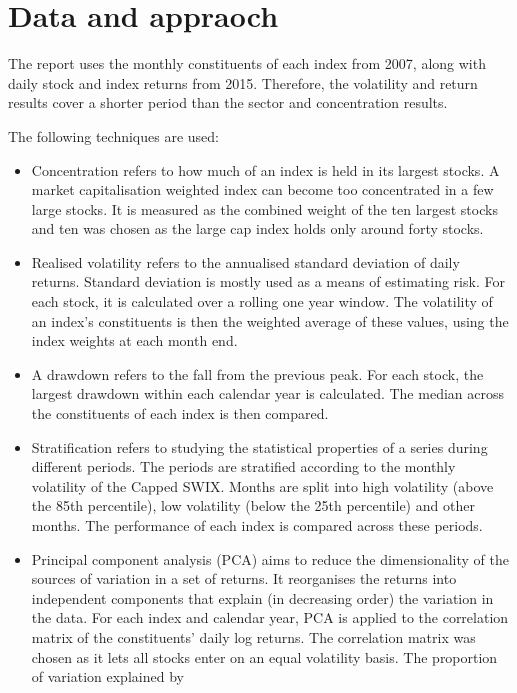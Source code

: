 \documentclass[11pt,preprint]{elsarticle}
\numberwithin{equation}{section}
\numberwithin{figure}{section}
\numberwithin{table}{section}
\def\tightlist{} %
\begin{document}
\section{Data and appraoch}\label{data-and-appraoch}

The report uses the monthly constituents of each index from 2007, along
with daily stock and index returns from 2015. Therefore, the volatility
and return results cover a shorter period than the sector and
concentration results.

The following techniques are used:

\begin{itemize}
\tightlist
\item
  Concentration refers to how much of an index is held in its largest
  stocks. A market capitalisation weighted index can become too
  concentrated in a few large stocks. It is measured as the combined
  weight of the ten largest stocks and ten was chosen as the large cap
  index holds only around forty stocks.
\item
  Realised volatility refers to the annualised standard deviation of
  daily returns. Standard deviation is mostly used as a means of
  estimating risk. For each stock, it is calculated over a rolling one
  year window. The volatility of an index's constituents is then the
  weighted average of these values, using the index weights at each
  month end.
\item
  A drawdown refers to the fall from the previous peak. For each stock,
  the largest drawdown within each calendar year is calculated. The
  median across the constituents of each index is then compared.
\item
  Stratification refers to studying the statistical properties of a
  series during different periods. The periods are stratified according
  to the monthly volatility of the Capped SWIX. Months are split into
  high volatility (above the 85th percentile), low volatility (below the
  25th percentile) and other months. The performance of each index is
  compared across these periods.
\item
  Principal component analysis (PCA) aims to reduce the dimensionality
  of the sources of variation in a set of returns. It reorganises the
  returns into independent components that explain (in decreasing order)
  the variation in the data. For each index and calendar year, PCA is
  applied to the correlation matrix of the constituents' daily log
  returns. The correlation matrix was chosen as it lets all stocks enter
  on an equal volatility basis. The proportion of variation explained by

\end{itemize}
\end{document}

